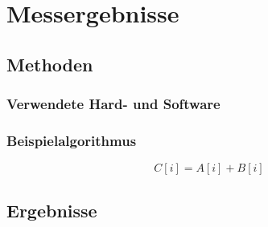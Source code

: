 \chapter{Messergebnisse}\label{messergebnisse}

\section{Methoden}\label{messergebnisse:methoden}

\subsection{Verwendete Hard- und Software}\label{messergebnisse:methoden:stack}

\subsection{Beispielalgorithmus}\label{messergebnisse:methoden:algorithmus}

\cite{benner2018}

\begin{equation}
    C[i] = A[i] + B[i]
\end{equation}

\section{Ergebnisse}\label{messergebnisse:ergebnisse}
